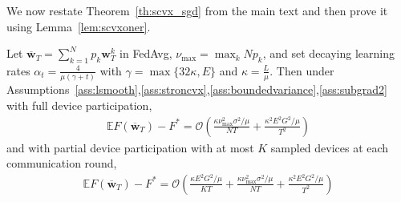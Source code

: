 We now restate Theorem~\ref{th:scvx_sgd} from the main text and then prove it using Lemma~\ref{lem:scvxoner}.
\begin{thm}
	Let $\overline{\mathbf{w}}_{T}=\sum_{k=1}^{N}p_{k}\mathbf{w}_{T}^{k}$ in FedAvg,
	$\nu_{\max}=\max_{k}Np_{k}$, and set decaying learning rates $\alpha_{t}=\frac{4}{\mu(\gamma+t)}$
	with $\gamma=\max\{32\kappa,E\}$ and $\kappa=\frac{L}{\mu}$. Then
	under Assumptions~\ref{ass:lsmooth},\ref{ass:stroncvx},\ref{ass:boundedvariance},\ref{ass:subgrad2} with full device participation, 
	\begin{align*}
	\mathbb{E}F(\overline{\mathbf{w}}_{T})-F^{\ast}=\mathcal{O}\left(\frac{\kappa\nu_{\max}^{2}\sigma^{2}/\mu}{NT}+\frac{\kappa^{2}E^{2}G^{2}/\mu}{T^{2}}\right)
	\end{align*}
	and with partial device participation with at most $K$ sampled devices
	at each communication round, 
	\begin{align*}
	\mathbb{E}F(\overline{\mathbf{w}}_{T})-F^{\ast}=\mathcal{O}\left(\frac{\kappa E^{2}G^{2}/\mu}{KT}+\frac{\kappa\nu_{\max}^{2}\sigma^{2}/\mu}{NT}+\frac{\kappa^{2}E^{2}G^{2}/\mu}{T^{2}}\right)
	\end{align*}
\end{thm}

